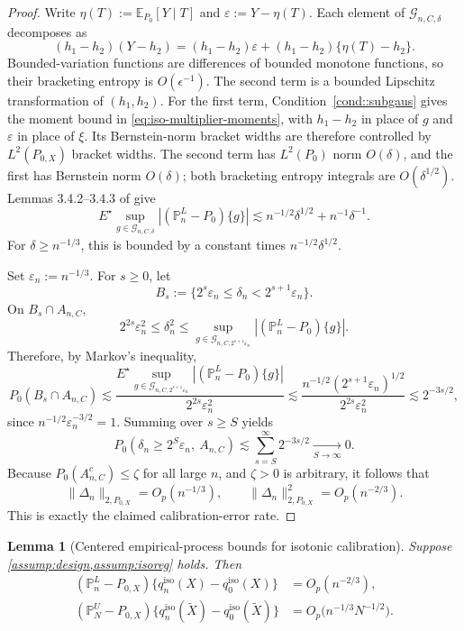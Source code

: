 \documentclass{article}
\theoremstyle{plain}
\newtheorem{lemma}{Lemma}
\theoremstyle{definition}
\newcommand{\E}{\mathbb{E}}
\newcommand{\1}{\mathbf{1}}
\newcommand{\Pl}{\mathbb{P}^{L}_n}
\newcommand{\Pu}{\mathbb{P}^{U}_N}
\newcommand{\Px}{P_{0,X}}
\begin{document}
\begin{proof}
Write \(\eta(T):=\E_{P_0}[Y\mid T]\) and \(\varepsilon:=Y-\eta(T)\). Each element of \(\mathcal G_{n,C,\delta}\) decomposes as
\[
(h_1-h_2)(Y-h_2)
=
(h_1-h_2)\varepsilon+(h_1-h_2)\{\eta(T)-h_2\}.
\]
Bounded-variation functions are differences of bounded monotone functions, so their bracketing entropy is \(O(\epsilon^{-1})\). The second term is a bounded Lipschitz transformation of \((h_1,h_2)\). For the first term, Condition~\ref{cond::subgaus} gives the moment bound in \eqref{eq:iso-multiplier-moments}, with \(h_1-h_2\) in place of \(g\) and \(\varepsilon\) in place of \(\xi\). Its Bernstein-norm bracket widths are therefore controlled by \(L^2(\Px)\) bracket widths. The second term has \(L^2(P_0)\) norm \(O(\delta)\), and the first has Bernstein norm \(O(\delta)\); both bracketing entropy integrals are \(O(\delta^{1/2})\). Lemmas 3.4.2--3.4.3 of \citet{vdvwellner1996} give
\[
E^\star\sup_{g\in\mathcal G_{n,C,\delta}}|(\Pl-P_0)\{g\}|
\lesssim
n^{-1/2}\delta^{1/2}+n^{-1}\delta^{-1}.
\]
For \(\delta\ge n^{-1/3}\), this is bounded by a constant times \(n^{-1/2}\delta^{1/2}\).

Set \(\varepsilon_n:=n^{-1/3}\). For \(s\ge 0\), let
\[
B_s:=\{2^s\varepsilon_n\le \delta_n<2^{s+1}\varepsilon_n\}.
\]
On \(B_s\cap A_{n,C}\),
\[
2^{2s}\varepsilon_n^2
\le
\delta_n^2
\le
\sup_{g\in\mathcal G_{n,C,2^{s+1}\varepsilon_n}}|(\Pl-P_0)\{g\}|.
\]
Therefore, by Markov's inequality,
\[
P_0(B_s\cap A_{n,C})
\lesssim
\frac{E^\star\sup_{g\in\mathcal G_{n,C,2^{s+1}\varepsilon_n}}|(\Pl-P_0)\{g\}|}{2^{2s}\varepsilon_n^2}
\lesssim
\frac{n^{-1/2}(2^{s+1}\varepsilon_n)^{1/2}}{2^{2s}\varepsilon_n^2}
\lesssim
2^{-3s/2},
\]
since \(n^{-1/2}\varepsilon_n^{-3/2}=1\). Summing over \(s\ge S\) yields
\[
P_0(\delta_n\ge 2^S\varepsilon_n,\ A_{n,C})
\lesssim
\sum_{s=S}^\infty 2^{-3s/2}
\xrightarrow[S\to\infty]{} 0.
\]
Because \(P_0(A_{n,C}^c)\le \zeta\) for all large \(n\), and \(\zeta>0\) is arbitrary, it follows that
\[
\|\Delta_n\|_{2,\Px}=O_p(n^{-1/3}),
\qquad
\|\Delta_n\|_{2,\Px}^2=O_p(n^{-2/3}).
\]
This is exactly the claimed calibration-error rate.
\end{proof}

\begin{lemma}[Centered empirical-process bounds for isotonic calibration]
\label{lem:eprate}
Suppose \cref{assump:design,assump:isoreg} holds. Then
\[\begin{aligned}
(\Pl-\Px)\{q_n^{\mathrm{iso}}(X)-q_0^{\mathrm{iso}}(X)\}&=O_p(n^{-2/3}),\\
(\Pu-\Px)\{q_n^{\mathrm{iso}}(\widetilde X)-q_0^{\mathrm{iso}}(\widetilde X)\}&=O_p\bigl(n^{-1/3}N^{-1/2}\bigr).
\end{aligned}\]
\end{lemma}
\end{document}
